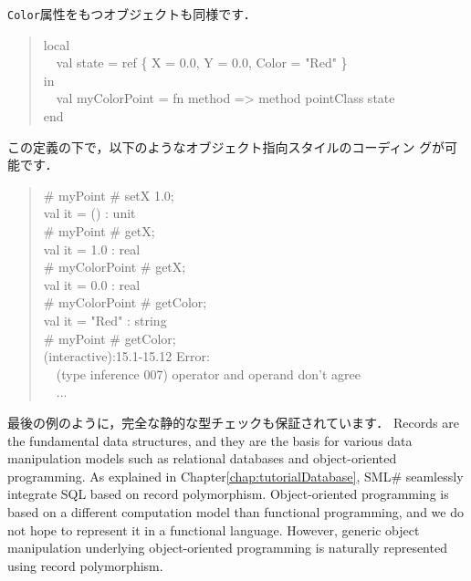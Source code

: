 \documentclass{jbook}
\newcommand{\smlsharp}{SML\#}
\newcommand{\myem}{\mbox{\ \ }}
\begin{document}
	{\tt Color}属性をもつオブジェクトも同様です．
\begin{tt}
\begin{quote}
local\\
\myem  val state =  ref \{ X = 0.0, Y = 0.0, Color = "Red" \}\\
in \\
\myem val myColorPoint = fn method => method pointClass state\\
end
\end{quote}
\end{tt}
	この定義の下で，以下のようなオブジェクト指向スタイルのコーディン
グが可能です．
\begin{tt}\begin{quote}
\# myPoint \# setX 1.0;\\
val it = () : unit\\
\# myPoint \# getX;\\
val it = 1.0 : real\\
\# myColorPoint \# getX;\\
val it = 0.0 : real\\
\# myColorPoint \# getColor;\\
val it = "Red" : string\\
\# myPoint \# getColor;\\
(interactive):15.1-15.12 Error:\\
\myem  (type inference 007) operator and operand don't agree\\
\myem ...
\end{quote}\end{tt}
	最後の例のように，完全な静的な型チェックも保証されています．
\else%
	Records are the fundamental data structures, and they are the
basis for various data manipulation models such as relational databases
and object-oriented programming.
	As explained in Chapter\ref{chap:tutorialDatabase}, 
\smlsharp{} seamlessly integrate SQL based on record polymorphism.
	Object-oriented programming is based on a different computation
model than functional programming, and we do not hope to represent it in
a functional language.
	However, generic object manipulation underlying object-oriented
programming is naturally represented using record polymorphism.
	
\end{document}
